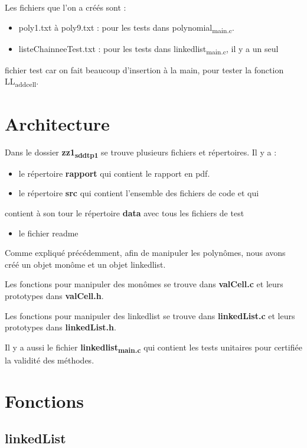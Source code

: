 \documentclass[11pt]{article}
\begin{document}
Les fichiers que l'on a créés sont :
\begin{itemize}
\item poly1.txt à poly9.txt : pour les tests dans polynomial\textsubscript{main.c}.
\item listeChainneeTest.txt : pour les tests dans linkedlist\textsubscript{main.c}, il y a un seul
\end{itemize}
fichier test car on fait beaucoup d'insertion à la main, pour tester la fonction
LL\textsubscript{add}\textsubscript{cell}.


\section{Architecture}
\label{sec:org4c30304}

Dans le dossier \textbf{zz1\textsubscript{sdd}\textsubscript{tp1}} se trouve plusieurs fichiers et répertoires.
Il y a :
\begin{itemize}
\item le répertoire \textbf{rapport} qui contient le rapport en pdf.
\item le répertoire \textbf{src} qui contient l'ensemble des fichiers de code et qui
\end{itemize}
contient à son tour le répertoire \textbf{data} avec tous les fichiers de test 
\begin{itemize}
\item le fichier readme
\end{itemize}

Comme expliqué précédemment, afin de manipuler les polynômes, nous avons créé un
objet monôme et un objet linkedlist.

Les fonctions pour manipuler des monômes se trouve dans \textbf{valCell.c} et leurs
prototypes dans \textbf{valCell.h}.

Les fonctions pour manipuler des linkedlist se trouve dans \textbf{linkedList.c} et leurs
prototypes dans \textbf{linkedList.h}.

Il y a aussi le fichier \textbf{linkedlist\textsubscript{main.c}} qui contient les tests unitaires
pour certifiée la validité des méthodes.


\section{Fonctions}
\label{sec:orgdaf0c5c}
\subsection{linkedList}
\label{sec:org3a18322}
\end{document}
